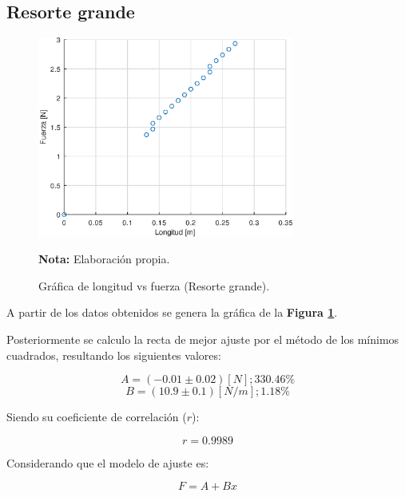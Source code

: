 \documentclass[letter,11pt]{article}
\newcommand{\source}[1]{\vspace{-11pt} \caption*{\small{\textbf{Nota:} {#1}}}}
\begin{document}
\subsection{Resorte grande}

\begin{figure}
\centering
\includegraphics[width=0.75\textwidth]{resources/o2.eps}
\caption{Gráfica de longitud vs fuerza (Resorte grande).}
\label{figura4}
\source{Elaboración propia.}
\end{figure}

A partir de los datos obtenidos se genera la gráfica de la
\textbf{Figura \ref{figura4}}.

Posteriormente se calculo la recta de mejor ajuste por el método de los mínimos
cuadrados, resultando los siguientes valores:

\begin{equation*}
    A = (-0.01 \pm 0.02) [N]; 330.46\%
\end{equation*}
\begin{equation*}
    B = (10.9 \pm 0.1) [N/m]; 1.18\%
\end{equation*}
\vspace{0.10cm}

Siendo su coeficiente de correlación ($r$):

\begin{equation*}
    r = 0.9989
\end{equation*}
\vspace{0.10cm}

Considerando que el modelo de ajuste es:

\begin{equation*}
    F = A + B x
\end{equation*}
\vspace{0.10cm}
\end{document}
